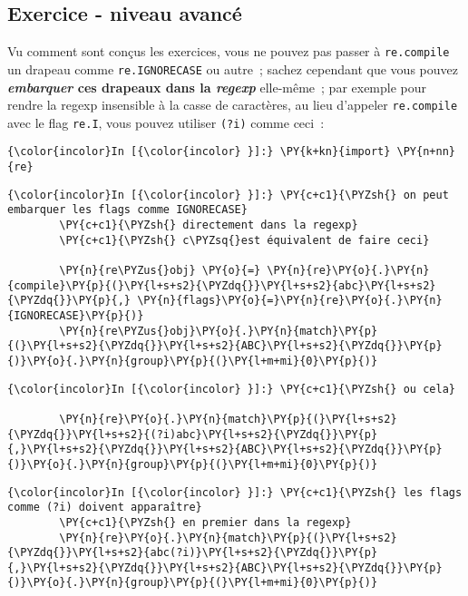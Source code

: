     \hypertarget{exercice---niveau-avancuxe9}{%
\subsection{Exercice - niveau
avancé}\label{exercice---niveau-avancuxe9}}

    Vu comment sont conçus les exercices, vous ne pouvez pas passer à
\texttt{re.compile} un drapeau comme \texttt{re.IGNORECASE} ou autre~;
sachez cependant que vous pouvez \textbf{\emph{embarquer} ces drapeaux
dans la \emph{regexp}} elle-même~; par exemple pour rendre la regexp
insensible à la casse de caractères, au lieu d'appeler
\texttt{re.compile} avec le flag \texttt{re.I}, vous pouvez utiliser
\texttt{(?i)} comme ceci~:

    \begin{Verbatim}[commandchars=\\\{\}]
{\color{incolor}In [{\color{incolor} }]:} \PY{k+kn}{import} \PY{n+nn}{re}
\end{Verbatim}


    \begin{Verbatim}[commandchars=\\\{\}]
{\color{incolor}In [{\color{incolor} }]:} \PY{c+c1}{\PYZsh{} on peut embarquer les flags comme IGNORECASE}
        \PY{c+c1}{\PYZsh{} directement dans la regexp}
        \PY{c+c1}{\PYZsh{} c\PYZsq{}est équivalent de faire ceci}
        
        \PY{n}{re\PYZus{}obj} \PY{o}{=} \PY{n}{re}\PY{o}{.}\PY{n}{compile}\PY{p}{(}\PY{l+s+s2}{\PYZdq{}}\PY{l+s+s2}{abc}\PY{l+s+s2}{\PYZdq{}}\PY{p}{,} \PY{n}{flags}\PY{o}{=}\PY{n}{re}\PY{o}{.}\PY{n}{IGNORECASE}\PY{p}{)}
        \PY{n}{re\PYZus{}obj}\PY{o}{.}\PY{n}{match}\PY{p}{(}\PY{l+s+s2}{\PYZdq{}}\PY{l+s+s2}{ABC}\PY{l+s+s2}{\PYZdq{}}\PY{p}{)}\PY{o}{.}\PY{n}{group}\PY{p}{(}\PY{l+m+mi}{0}\PY{p}{)}
\end{Verbatim}


    \begin{Verbatim}[commandchars=\\\{\}]
{\color{incolor}In [{\color{incolor} }]:} \PY{c+c1}{\PYZsh{} ou cela}
        
        \PY{n}{re}\PY{o}{.}\PY{n}{match}\PY{p}{(}\PY{l+s+s2}{\PYZdq{}}\PY{l+s+s2}{(?i)abc}\PY{l+s+s2}{\PYZdq{}}\PY{p}{,}\PY{l+s+s2}{\PYZdq{}}\PY{l+s+s2}{ABC}\PY{l+s+s2}{\PYZdq{}}\PY{p}{)}\PY{o}{.}\PY{n}{group}\PY{p}{(}\PY{l+m+mi}{0}\PY{p}{)}
\end{Verbatim}


    \begin{Verbatim}[commandchars=\\\{\}]
{\color{incolor}In [{\color{incolor} }]:} \PY{c+c1}{\PYZsh{} les flags comme (?i) doivent apparaître}
        \PY{c+c1}{\PYZsh{} en premier dans la regexp}
        \PY{n}{re}\PY{o}{.}\PY{n}{match}\PY{p}{(}\PY{l+s+s2}{\PYZdq{}}\PY{l+s+s2}{abc(?i)}\PY{l+s+s2}{\PYZdq{}}\PY{p}{,}\PY{l+s+s2}{\PYZdq{}}\PY{l+s+s2}{ABC}\PY{l+s+s2}{\PYZdq{}}\PY{p}{)}\PY{o}{.}\PY{n}{group}\PY{p}{(}\PY{l+m+mi}{0}\PY{p}{)}
\end{Verbatim}


